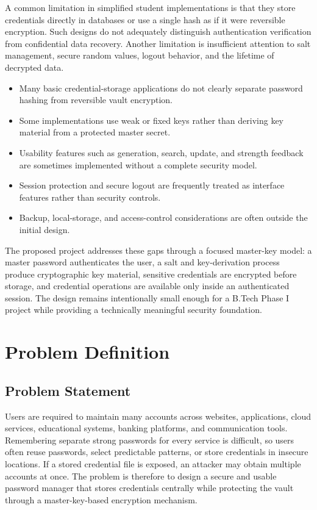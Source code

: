\documentclass[12pt,a4paper,oneside]{report}
\begin{document}
A common limitation in simplified student implementations is that they store credentials directly in databases or use a single hash as if it were reversible encryption. Such designs do not adequately distinguish authentication verification from confidential data recovery. Another limitation is insufficient attention to salt management, secure random values, logout behavior, and the lifetime of decrypted data.

\begin{itemize}
\item Many basic credential-storage applications do not clearly separate password hashing from reversible vault encryption.
\item Some implementations use weak or fixed keys rather than deriving key material from a protected master secret.
\item Usability features such as generation, search, update, and strength feedback are sometimes implemented without a complete security model.
\item Session protection and secure logout are frequently treated as interface features rather than security controls.
\item Backup, local-storage, and access-control considerations are often outside the initial design.
\end{itemize}

The proposed project addresses these gaps through a focused master-key model: a master password authenticates the user, a salt and key-derivation process produce cryptographic key material, sensitive credentials are encrypted before storage, and credential operations are available only inside an authenticated session. The design remains intentionally small enough for a B.Tech Phase I project while providing a technically meaningful security foundation.


\chapter{Problem Definition}

\section{Problem Statement}

Users are required to maintain many accounts across websites, applications, cloud services, educational systems, banking platforms, and communication tools. Remembering separate strong passwords for every service is difficult, so users often reuse passwords, select predictable patterns, or store credentials in insecure locations. If a stored credential file is exposed, an attacker may obtain multiple accounts at once. The problem is therefore to design a secure and usable password manager that stores credentials centrally while protecting the vault through a master-key-based encryption mechanism.
\end{document}
